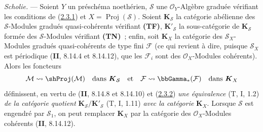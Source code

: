 \begin{env}[2.3.3]
\label{III.2.3.3-fr}
\emph{Scholie.} --- Soient $Y$ un préschéma noethérien, $\mathcal S$ une
$\mathcal O_Y$-Algèbre graduée vérifiant les conditions de
(\hyperref[III.2.3.1-fr]{2.3.1}) et $X=\operatorname{Proj}(\mathcal S)$.
Soient $\boldsymbol{K}_{\mathcal S}$ la catégorie abélienne des $\mathcal S$-Modules
gradués quasi-cohérents vérifiant \textbf{(TF)}, $\boldsymbol{K}'_{\mathcal S}$ la
sous-catégorie de $\boldsymbol{K}_{\mathcal S}$ formée des $\mathcal S$-Modules
vérifiant \textbf{(TN)}~; enfin, soit $\boldsymbol{K}_X$ la catégorie des
$\mathcal S_X$-Modules gradués quasi-cohérents de type fini $\mathcal F$
(ce qui revient à dire, puisque $\mathcal S_X$ est périodique
(\textbf{II}, 8.14.4 et 8.14.12), que les $\mathcal F_i$ sont des
$\mathcal O_X$-Modules cohérents). Alors les foncteurs
\[
\mathcal M\leadsto\shProj(\mathcal M)
\quad\text{dans }\boldsymbol{K}_{\mathcal S}
\quad\text{et}\quad
\mathcal F\leadsto\bbGamma_*(\mathcal F)
\quad\text{dans }\boldsymbol{K}_X
\]
définissent, en vertu de (\textbf{II}, 8.14.8 et 8.14.10) et
(\hyperref[III.2.3.2-fr]{2.3.2}) \emph{une équivalence} (T, I, 1.2) \emph{de la
catégorie quotient} $\boldsymbol{K}_{\mathcal S}/\boldsymbol{K}'_{\mathcal S}$ (T, I, 1.11) \emph{avec la
catégorie} $\boldsymbol{K}_X$. Lorsque $\mathcal S$ est engendré par $\mathcal S_1$,
on peut remplacer $\boldsymbol{K}_X$ par la catégorie des $\mathcal O_X$-Modules
cohérents (\textbf{II}, 8.14.12).
\end{env}

